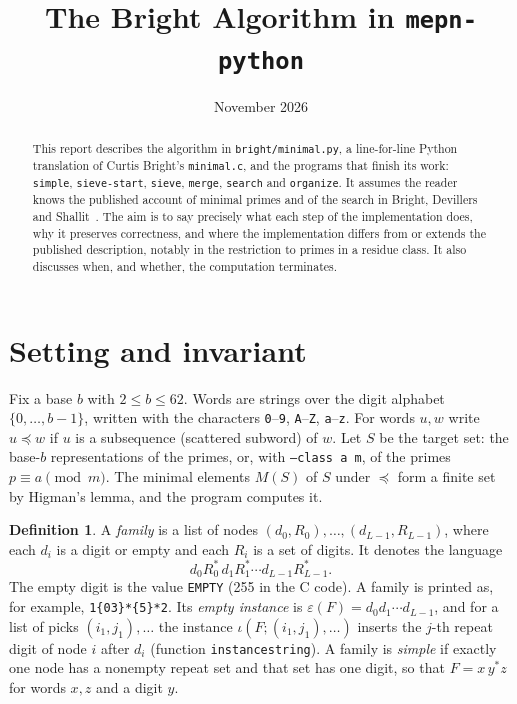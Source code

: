 \documentclass[11pt]{article}
\title{The Bright Algorithm in \texttt{mepn-python}}
\author{}  %
\date{November 2026}
\theoremstyle{definition}
\newtheorem{definition}[lemma]{Definition}
\theoremstyle{remark}
\newcommand{\code}[1]{\texttt{#1}}
\newcommand{\sw}{\preceq}   %
\begin{document}
\maketitle

\begin{abstract}
This report describes the algorithm in \code{bright/minimal.py}, a line-for-line Python translation of Curtis Bright's \code{minimal.c}, and the programs that finish its work: \code{simple}, \code{sieve-start}, \code{sieve}, \code{merge}, \code{search} and \code{organize}. It assumes the reader knows the published account of minimal primes and of the search in Bright, Devillers and Shallit~\cite{BDS}. The aim is to say precisely what each step of the implementation does, why it preserves correctness, and where the implementation differs from or extends the published description, notably in the restriction to primes in a residue class. It also discusses when, and whether, the computation terminates.
\end{abstract}

\tableofcontents

\section{Setting and invariant}

Fix a base $b$ with $2\le b\le 62$. Words are strings over the digit alphabet $\{0,\dots,b-1\}$, written with the characters \code{0}--\code{9}, \code{A}--\code{Z}, \code{a}--\code{z}. For words $u,w$ write $u\sw w$ if $u$ is a subsequence (scattered subword) of $w$. Let $S$ be the target set: the base-$b$ representations of the primes, or, with \code{--class a m}, of the primes $p\equiv a\pmod m$. The minimal elements $M(S)$ of $S$ under $\sw$ form a finite set by Higman's lemma, and the program computes it.

\begin{definition}
A \emph{family} is a list of nodes $(d_0,R_0),\dots,(d_{L-1},R_{L-1})$, where each $d_i$ is a digit or empty and each $R_i$ is a set of digits. It denotes the language
\[
  d_0R_0^*\,d_1R_1^*\cdots d_{L-1}R_{L-1}^*.
\]
The empty digit is the value \code{EMPTY} (255 in the C code). A family is printed as, for example, \code{1\{03\}*\{5\}*2}. Its \emph{empty instance} is $\varepsilon(F)=d_0d_1\cdots d_{L-1}$, and for a list of picks $(i_1,j_1),\dots$ the instance $\iota(F;(i_1,j_1),\dots)$ inserts the $j$-th repeat digit of node $i$ after $d_i$ (function \code{instancestring}). A family is \emph{simple} if exactly one node has a nonempty repeat set and that set has one digit, so that $F=x\,y^*z$ for words $x,z$ and a digit $y$.
\end{definition}
\end{document}

